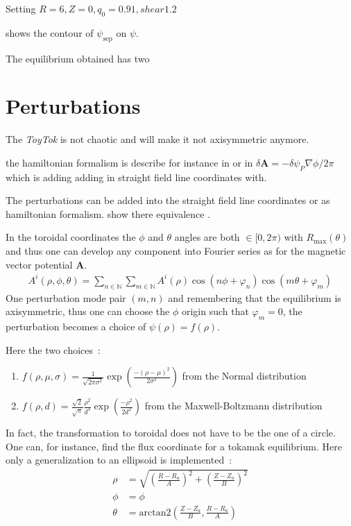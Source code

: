 Setting 
$R = 6, Z = 0, q_0 = 0.91, shear 1.2$

 shows the contour of $\psi_\text{sep}$ on $\psi$.

The equilibrium obtained has two 


\section{Perturbations}
The \textit{ToyTok} is not chaotic and will make it not axisymmetric anymore.


the hamiltonian formalism is describe for instance in \cite{viana_hamiltonian_2023} or in
\cite{escande_description_2024} $\delta\textbf{A} = -\delta\psi_P\nabla\phi/2\pi$ which is adding adding in straight field line coordinates with. 

The perturbations can be added into the straight field line coordinates or as hamiltonian formalism. show there equivalence  .

In the toroidal coordinates the $\phi$ and $\theta$ angles are both $\in [0, 2\pi)$ with $R_\text{max}(\theta)$ and thus one can develop any component into Fourier series as for the magnetic vector potential $\textbf{A}$.
\begin{align*}
    A^i(\rho,\phi,\theta) = \sum\limits_{n\in\mathbb{N}}\sum\limits_{m\in\mathbb{N}} A^i(\rho)\cos(n\phi + \varphi_n)\cos(m\theta + \varphi_m)
\end{align*}
One perturbation mode pair $(m,n)$ and remembering that the equilibrium is axisymmetric, thus one can choose the $\phi$ origin such that $\varphi_m = 0$, the perturbation becomes a choice of $\psi(\rho) = f(\rho)$.

Here the two choices~:

\begin{enumerate}
    \item $f(\rho, \mu, \sigma) = \frac{1}{\sqrt{2\pi\sigma^2}}\exp\left(\frac{-(\rho-\mu)^2}{2\sigma^2}\right)$ from the Normal distribution
    
    \item $f(\rho, d) = \frac{\sqrt{2}}{\sqrt{\pi}}\frac{\rho^2}{d^3}\exp\left(\frac{-\rho^2}{2d^2}\right)$ from the Maxwell-Boltzmann distribution
\end{enumerate}

In fact, the transformation to toroidal does not have to be the one of a circle. One can, for instance, find the flux coordinate for a tokamak equilibrium. Here only a generalization to an ellipsoid is implemented~:
\begin{align*}
    \rho &= \sqrt{\left(\frac{R-R_a}{A}\right)^2 + \left(\frac{Z-Z_a}{B}\right)^2}\\
    \phi &= \phi\\
    \theta &= \text{arctan2}(\frac{Z-Z_a}{B}, \frac{R-R_a}{A})\\
\end{align*}

